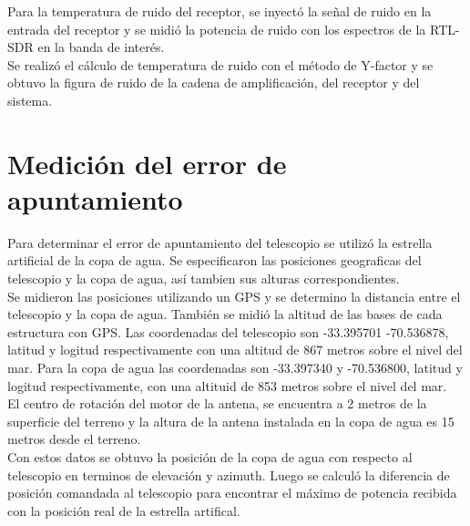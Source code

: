 Para la temperatura de ruido del receptor, se inyectó la señal de ruido en la entrada del receptor y se midió la potencia de ruido con los espectros de la RTL-SDR en la banda de interés.\\


Se realizó el cálculo de temperatura de ruido con el método de Y-factor y se obtuvo la figura de ruido de la cadena de amplificación, del receptor y del sistema.\\


\section{Medición del error de apuntamiento}

Para determinar el error de apuntamiento del telescopio se utilizó la estrella artificial de la copa de agua. Se especificaron las posiciones geograficas del telescopio y la copa de agua, así tambien sus alturas correspondientes.\\

Se midieron las posiciones utilizando un GPS y se determino la distancia entre el telescopio y la copa de agua. También se midió la altitud de las bases de cada estructura con GPS. Las coordenadas del telescopio son -33.395701 -70.536878, latitud y logitud respectivamente con una altitud de 867 metros sobre el nivel del mar. Para la copa de agua las coordenadas son -33.397340 y -70.536800, latitud y logitud respectivamente, con una altituid de 853 metros sobre el nivel del mar.\\

El centro de rotación del motor de la antena, se encuentra a 2 metros de la superficie del terreno y la altura de la antena instalada en la copa de agua es 15 metros desde el terreno.\\

Con estos datos se obtuvo la posición de la copa de agua con respecto al telescopio en terminos de elevación y azimuth. Luego se calculó la diferencia de posición comandada al telescopio para encontrar el máximo de potencia recibida con la posición real de la estrella artifical.\\

